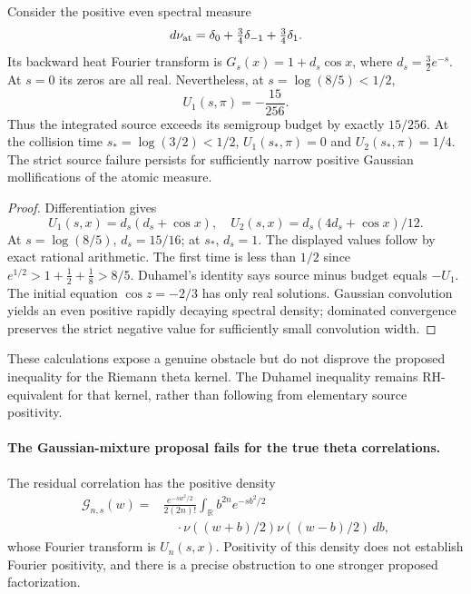 \begin{proposition}
\label{prop:atomicduhamel}
Consider the positive even spectral measure
\[
d\nu_{\rm at}=\delta_0+
\tfrac34\delta_{-1}+\tfrac34\delta_1.
\]
Its backward heat Fourier transform is
$G_s(x)=1+d_s\cos x$, where
$d_s=\tfrac32e^{-s}$.
At $s=0$ its zeros are all real.
Nevertheless, at $s=\log(8/5)<1/2$,
\begin{equation}
U_1(s,\pi)=-\frac{15}{256}.
\label{eq:atomicnegative}
\end{equation}
Thus the integrated source exceeds its
semigroup budget by exactly $15/256$.
At the collision time $s_*=\log(3/2)<1/2$,
$U_1(s_*,\pi)=0$ and $U_2(s_*,\pi)=1/4$.
The strict source failure persists for
sufficiently narrow positive Gaussian
mollifications of the atomic measure.
\end{proposition}
\begin{proof}
Differentiation gives
\[
U_1(s,x)=d_s(d_s+\cos x),\quad
U_2(s,x)=d_s(4d_s+\cos x)/12.
\]
At $s=\log(8/5)$, $d_s=15/16$;
at $s_*$, $d_s=1$. The
displayed values follow by exact
rational arithmetic. The first time
is less than $1/2$ since
$e^{1/2}>1+\frac12+\frac18>8/5$.
Duhamel's identity says
source minus budget equals $-U_1$.
The initial equation $\cos z=-2/3$
has only real solutions.
Gaussian convolution yields an
even positive rapidly decaying
spectral density; dominated
convergence preserves the strict
negative value for sufficiently
small convolution width.
\end{proof}

These calculations expose a genuine
obstacle but do not disprove the proposed
inequality for the Riemann theta kernel.
The Duhamel inequality remains
RH-equivalent for that kernel, rather
than following from elementary source
positivity.

\paragraph{The Gaussian-mixture proposal fails
for the true theta correlations.}
The residual correlation has the positive density
\begin{align}
\mathcal G_{n,s}(w)
={}&\frac{e^{-sw^2/2}}{2(2n)!}
\int_{\mathbb R}b^{2n}e^{-sb^2/2}\nonumber\\
&\quad\cdot\nu((w+b)/2)\nu((w-b)/2)\,db,
\label{eq:duhamelcorrelation}
\end{align}
whose Fourier transform is $U_n(s,x)$.
Positivity of this density does not
establish Fourier positivity, and
there is a precise obstruction to
one stronger proposed factorization.

